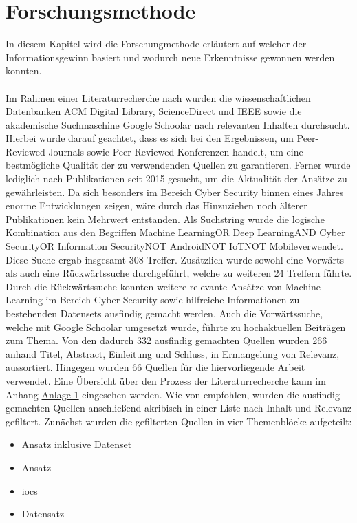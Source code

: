 \documentclass[
    12pt, %
    DIV10,
    ngerman, %
    a4paper, %
    oneside, %
    titlepage, %
    parskip=half, %
    headings=normal, %
    listof=totoc, %
    bibliography=totoc, %
    index=totoc, %
    captions=tableheading, %
    final %
]{scrreprt}
\begin{document}
\chapter{Forschungsmethode}
In diesem Kapitel wird die Forschungmethode erläutert auf welcher der Informationsgewinn basiert und wodurch neue Erkenntnisse gewonnen werden konnten.\\\\
Im Rahmen einer Literaturrecherche nach \citeauthor{Webster2002} wurden die wissenschaftlichen Datenbanken ACM Digital Library, ScienceDirect und IEEE sowie die akademische Suchmaschine Google Schoolar nach relevanten Inhalten durchsucht. Hierbei wurde darauf geachtet, dass es sich bei den Ergebnissen, um Peer-Reviewed Journals sowie Peer-Reviewed Konferenzen handelt, um eine bestmögliche Qualität der zu verwendenden Quellen zu garantieren. Ferner wurde lediglich nach Publikationen seit 2015 gesucht, um die Aktualität der Ansätze zu gewährleisten. Da sich besonders im Bereich Cyber Security binnen eines Jahres enorme Entwicklungen zeigen, wäre durch das Hinzuziehen noch älterer Publikationen kein Mehrwert entstanden. Als Suchstring wurde die logische Kombination aus den Begriffen \glqq Machine Learning\grqq OR \glqq Deep Learning\grqq AND \glqq Cyber Security\grqq OR \glqq Information Security\grqq NOT \glqq Android\grqq NOT \glqq IoT\grqq NOT \glqq Mobile\grqq verwendet. Diese Suche ergab insgesamt 308 Treffer. Zusätzlich wurde sowohl eine Vorwärts- als auch eine Rückwärtssuche durchgeführt, welche zu weiteren 24 Treffern führte. Durch die Rückwärtssuche konnten weitere relevante Ansätze von Machine Learning im Bereich Cyber Security sowie hilfreiche Informationen zu bestehenden Datensets ausfindig gemacht werden. Auch die Vorwärtssuche, welche mit Google Schoolar umgesetzt wurde, führte zu hochaktuellen Beiträgen zum Thema. Von den dadurch 332 ausfindig gemachten Quellen wurden 266 anhand Titel, Abstract, Einleitung und Schluss, in Ermangelung von Relevanz, aussortiert. Hingegen wurden 66 Quellen für die hiervorliegende Arbeit verwendet. Eine Übersicht über den Prozess der Literaturrecherche kann im Anhang \hyperref[rm]{Anlage 1} eingesehen werden. Wie von \citeauthor{Webster2002} empfohlen, wurden die ausfindig gemachten Quellen anschließend akribisch in einer Liste nach Inhalt und Relevanz gefiltert. Zunächst wurden die gefilterten Quellen in vier Themenblöcke aufgeteilt:
\begin{itemize}
\item Ansatz inklusive Datenset
\item Ansatz
\item \ac{iocs}
\item Datensatz
\end{itemize}
\end{document}

